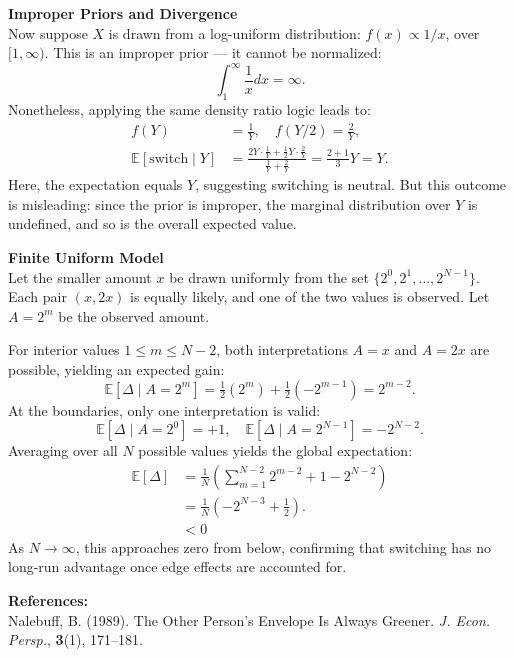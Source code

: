 \begin{technical}
\textbf{Improper Priors and Divergence}\\[0.5em]
Now suppose $X$ is drawn from a log-uniform distribution: $f(x) \propto 1/x$, over $[1, \infty)$. This is an improper prior — it cannot be normalized:
\[
\int_1^{\infty} \frac{1}{x} dx = \infty.
\]
Nonetheless, applying the same density ratio logic leads to:
\begin{align}
f(Y) &= \frac{1}{Y}, \quad f(Y/2) = \frac{2}{Y},\\
\mathbb{E}[\text{switch} \mid Y] &= \frac{2Y \cdot \frac{1}{Y} + \tfrac{1}{2}Y \cdot \frac{2}{Y}}{\frac{1}{Y} + \frac{2}{Y}} = \frac{2 + 1}{3}Y = Y.
\end{align}
Here, the expectation equals $Y$, suggesting switching is neutral. But this outcome is misleading: since the prior is improper, the marginal distribution over $Y$ is undefined, and so is the overall expected value. 

\textbf{Finite Uniform Model}\\[0.5em]
Let the smaller amount $x$ be drawn uniformly from the set $\{2^0, 2^1, \dots, 2^{N-1}\}$. Each pair $(x, 2x)$ is equally likely, and one of the two values is observed. Let $A = 2^m$ be the observed amount.

For interior values $1 \le m \le N - 2$, both interpretations $A = x$ and $A = 2x$ are possible, yielding an expected gain:
\[
\mathbb{E}[\Delta \mid A = 2^m] = \tfrac{1}{2}(2^m) + \tfrac{1}{2}(-2^{m-1}) = 2^{m-2}.
\]
At the boundaries, only one interpretation is valid:
\[
\mathbb{E}[\Delta \mid A = 2^0] = +1, \quad
\mathbb{E}[\Delta \mid A = 2^{N-1}] = -2^{N-2}.
\]
Averaging over all $N$ possible values yields the global expectation:
\begin{align}
\mathbb{E}[\Delta] &= \frac{1}{N} \left( \sum_{m=1}^{N-2} 2^{m-2} + 1 - 2^{N-2} \right)\\
&= \frac{1}{N} \left( -2^{N-3} + \tfrac{1}{2} \right).\\
&< 0
\end{align}
As $N \to \infty$, this approaches zero from below, confirming that switching has no long-run advantage once edge effects are accounted for.

\vspace{0.5em}
\textbf{References:}\\
Nalebuff, B. (1989). The Other Person’s Envelope Is Always Greener. \textit{J. Econ. Persp.}, \textbf{3}(1), 171--181.
\end{technical}
